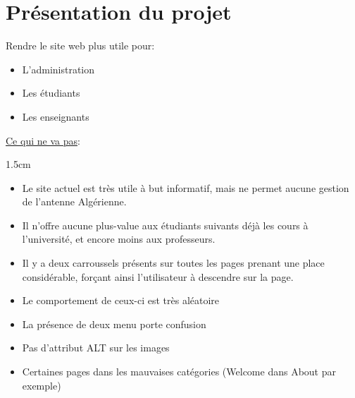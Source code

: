 \documentclass[oneside]{report}
\newcommand{\indentunder}{1.5cm}
\begin{document}
	\chapter{Présentation du projet}
	{
		\par Rendre le site web plus utile pour:
		\begin{itemize}
			\item{L'administration}
			\item{Les étudiants}
			\item{Les enseignants}
		\end{itemize}
		\vspace{1cm}
		\par\underline{Ce qui ne va pas}:
		\vspace{.5cm}
		\begin{adjustwidth}{\indentunder}{}
		\begin{itemize}
			\item Le site actuel est très utile à but informatif, mais ne permet aucune gestion de l'antenne Algérienne.
			\item Il n'offre aucune plus-value aux étudiants suivants déjà les cours à l'université, et encore moins aux professeurs.
			\item Il y a deux carroussels présents sur toutes les pages prenant une place considérable, forçant ainsi l'utilisateur à descendre sur la page.
			\item Le comportement de ceux-ci est très aléatoire
			\item La présence de deux menu porte confusion
			\item Pas d'attribut ALT sur les images
			\item Certaines pages dans les mauvaises catégories (Welcome dans About par exemple)
		\end{itemize}
		\end{adjustwidth}
	\vspace{1cm}
}
\end{document}
